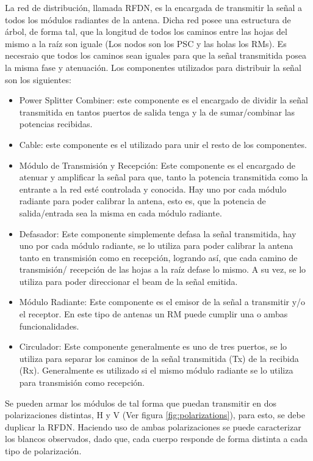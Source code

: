 La red de distribución, llamada RFDN, es la encargada de transmitir la señal a todos los módulos radiantes de la antena. 
Dicha red posee una estructura de árbol, de forma tal, que la longitud de todos los caminos entre las hojas del mismo a 
la raíz son iguale (Los nodos son los PSC y las holas los RMs). Es necesraio que todos los caminos sean iguales para que la 
señal transmitida posea la misma fase y atenuación. Los componentes utilizados para distribuir la señal son los siguientes:

\begin{itemize}
	\item Power Splitter Combiner: este componente es el encargado de dividir la señal transmitida en tantos puertos de salida 
		tenga y la de sumar/combinar las potencias recibidas.
	\item Cable: este componente es el utilizado para unir el resto de los componentes.
	\item Módulo de Transmisión y Recepción: Este componente es el encargado de atenuar y amplificar la señal para que, tanto
		la potencia transmitida como la entrante a la red esté controlada y conocida. Hay uno por cada módulo radiante para 
		poder calibrar la antena, esto es, que la potencia de salida/entrada sea la misma en cada módulo radiante.
	\item Defasador: Este componente simplemente defasa la señal transmitida, hay uno por cada módulo radiante, se lo utiliza
		para poder calibrar la antena tanto en transmisión como en recepción, logrando así, que cada camino de transmisión/
		recepción de las hojas a la raíz defase lo mismo. A su vez, se lo utiliza para poder direccionar el beam de la señal
		emitida.
	\item Módulo Radiante: Este componente es el emisor de la señal a transmitir y/o el receptor. En este tipo de antenas un 
		RM puede cumplir una o ambas funcionalidades.
	\item Circulador: Este componente generalmente es uno de tres puertos, se lo utiliza para separar los caminos de la 
		señal transmitida (Tx) de la recibida (Rx). Generalmente es utilizado si el mismo módulo radiante se lo utiliza para
		transmisión como recepción.
\end{itemize}

Se pueden armar los módulos de tal forma que puedan transmitir en dos polarizaciones distintas, H y V (Ver figura 
\ref{fig:polarizations}), para esto, se debe duplicar la RFDN. Haciendo uso de ambas polarizaciones se puede caracterizar 
los blancos observados, dado que, cada cuerpo responde de forma distinta a cada tipo de polarización.

